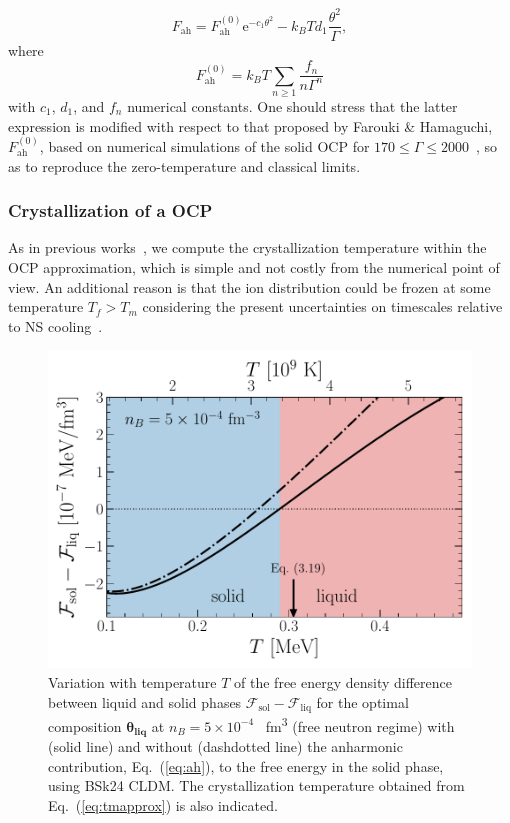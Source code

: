 \begin{equation}
  F_{\text{ah}} =
  F_{\text{ah}}^{(0)}\text{e}^{-c_1\theta^2} 
  - k_B T d_1\frac{\theta^2}{\Gamma},\label{eq:ah}
\end{equation}
%
where
%
\begin{equation}
  F_{\text{ah}}^{(0)} = k_B T\sum_{n \geq 1}\frac{f_n}{n\Gamma^n}
\end{equation}
%
with $c_1$, $d_1$, and $f_n$ numerical constants. One should stress that
the latter expression is modified with respect to that proposed by Farouki \&
Hamaguchi, $F_{\text{ah}}^{(0)}$, based on numerical simulations of 
the solid OCP for $170 \leq \Gamma \leq 2000$~\cite{Farouki1993}, so as to
reproduce the zero-temperature and classical limits.

\subsubsection{Crystallization of a OCP}

As in previous works~\cite{Fantina2020,Carreau2019,Carreau2020}, we compute 
the crystallization temperature within the OCP approximation, which is 
simple and not costly from the numerical point of view. An additional reason is
that the ion distribution could be frozen at some temperature $T_f > T_m$ 
considering the present uncertainties on timescales relative to NS 
cooling~\cite{Goriely2011}.

\begin{figure}[!t]
  \begin{center}
    \includegraphics[width=0.9\linewidth]{figures/fliqsol.pdf}
  \end{center}
  \caption[Free energy density difference between liquid and solid phases
  versus temperature]{Variation with temperature $T$ of the free energy density
  difference between liquid and solid phases
$\mathcal{F}_{\text{sol}}-\mathcal{F}_{\text{liq}}$ for the optimal composition
$\bm{\theta_{\text{liq}}}$ at $n_B=5\times 10^{-4}$ 
\si{\per \cubic\femto\meter} (free neutron regime) with (solid line) and 
without (dashdotted line) the anharmonic contribution, Eq.~(\ref{eq:ah}), to 
the free energy in the solid phase, using BSk24 CLDM. The crystallization 
temperature obtained from Eq.~(\ref{eq:tmapprox}) is also 
indicated.}\label{fig:fliqsol}
\end{figure}

